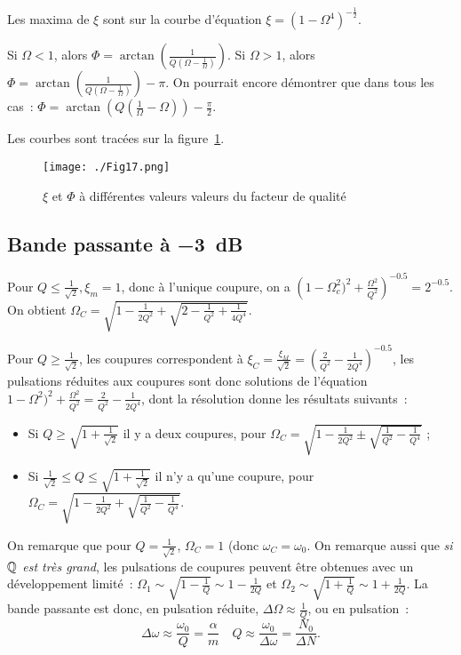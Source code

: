 Les maxima de \(\xi\) sont sur la courbe d'équation \(\xi =
(1-\Omega^4)^{-\frac{1}{2}}\).

Si \(\Omega <1\), alors \(\Phi =
\arctan\left(\frac{1}{Q\left(\Omega-\frac{1}{\Omega}\right)}\right)\). Si
\(\Omega >1\), alors \(\Phi =
\arctan\left(\frac{1}{Q\left(\Omega-\frac{1}{\Omega}\right)}\right) - \pi\). On
pourrait encore démontrer que dans tous les cas~: \(\Phi =
\arctan\left(Q\left(\frac{1}{\Omega}-\Omega\right)\right)-\frac{\pi}{2}\).

Les courbes sont tracées sur la figure~\ref{fig:oscforcees}.

\begin{figure}[!h]%
  \centering
  \texttt{[image: ./Fig17.png]}
  \caption{\(\xi\) et \(\Phi\) à différentes valeurs valeurs du facteur de
  qualité}
  \label{fig:oscforcees}
\end{figure}%

\subsection{Bande passante à \SI{-3}{\deci\bel}}%

Pour \(Q \leq \frac{1}{\sqrt{2}}, \xi_m = 1\), donc à l'unique coupure, on a
\(\left(1-\Omega_c^2)^2+\frac{\Omega^2}{Q^2}\right)^{-0.5} = 2^{-0.5}\). On
obtient \(\Omega_C = \sqrt{1 - \frac{1}{2Q^2} + \sqrt{2 - \frac{1}{Q^2} +
\frac{1}{4Q^4}}}\).%

Pour \(Q \geqslant \frac{1}{\sqrt{2}}\), les coupures correspondent à \(\xi_C =
\frac{\xi_M}{\sqrt{2}} = \left(\frac{2}{Q^2}-\frac{1}{2Q^4}\right)^{-0.5}\), 
les%
pulsations réduites aux coupures sont donc solutions de l'équation
\(1-\Omega^2)^2 +\frac{\Omega^2}{Q^2} = \frac{2}{Q^2} - \frac{1}{2Q^4}\), dont
la résolution donne les résultats suivants~:
\begin{itemize}%
  \item Si \(Q \geqslant \sqrt{1 + \frac{1}{\sqrt{2}}}\) il y a deux coupures,
    pour \(\Omega_C = \sqrt{1-\frac{1}{2Q^2} \pm \sqrt{\frac{1}{Q^2} -
    \frac{1}{Q^4}}}\) ;
  \item Si \(\frac{1}{\sqrt{2}} \leqslant Q \leqslant \sqrt{1 +
    \frac{1}{\sqrt{2}}}\) il n'y a qu'une coupure,
    pour \(\Omega_C = \sqrt{1-\frac{1}{2Q^2} + \sqrt{\frac{1}{Q^2} -
    \frac{1}{Q^4}}}\).
\end{itemize}%
On remarque que pour \(Q = \frac{1}{\sqrt{2}}\), \(\Omega_C = 1\) (donc
\(\omega_C = \omega_0\). On remarque aussi que \emph{si \(\mathbb{Q}\) est très grand},
les pulsations de coupures peuvent être obtenues avec un développement limité~:
\(\Omega_1 \sim \sqrt{1-\frac{1}{Q}} \sim 1-\frac{1}{2Q}\) et \(\Omega_2 \sim
\sqrt{1+\frac{1}{Q}} \sim 1+\frac{1}{2Q}\). La bande passante est donc, en%
pulsation réduite, \(\Delta\Omega \approx \frac{1}{Q}\), ou en pulsation~:
\begin{equation}%
  \Delta\omega \approx \frac{\omega_0}{Q} = \frac{\alpha}{m} \quad Q \approx
  \frac{\omega_0}{\Delta\omega}=\frac{N_0}{\Delta N}.
\end{equation}%

